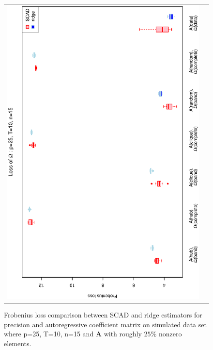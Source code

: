 \documentclass[a4paper]{article}
\begin{document}
\begin{figure}[h!]
\begin{tabular}{cc}
\includegraphics[scale=0.45,angle=270]{LossOmega25T10N15_25.eps}
\end{tabular}
\caption{Frobenius loss comparison between SCAD and ridge estimators for precision and autoregressive coefficient matrix on simulated data set where p=25, T=10, n=15 and $\mathbf{A}$ with roughly $25\%$ nonzero elements.}
\label{figSM:Loss25T10N15_25}
\end{figure}

\end{document}
